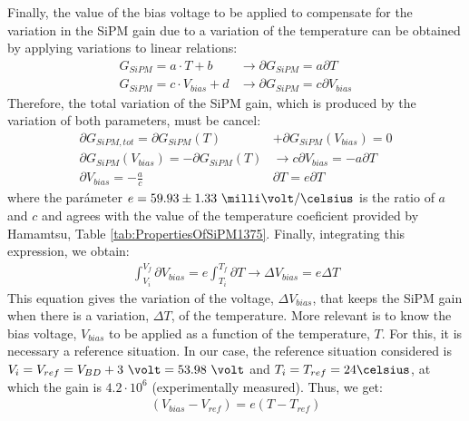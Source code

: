 Finally, the value of the bias voltage to be applied to compensate for the variation in the SiPM gain due to a variation of the temperature can be obtained by applying variations to linear relations:
\begin{equation*}
\begin{split}
G_{SiPM}=a \cdot{} T + b  &\longrightarrow \partial G_{SiPM}= a \partial T\\
G_{SiPM}=c \cdot{} V_{bias} + d &\longrightarrow \partial G_{SiPM}= c \partial V_{bias}
\label{Gain_compensationVariations}
\end{split}
\end{equation*} 
Therefore, the total variation of the SiPM gain, which is produced by the variation of both parameters, must be cancel:
\begin{equation*}
\begin{split}
\partial G_{SiPM, tot}= \partial G_{SiPM}(T) &+ \partial G_{SiPM}(V_{bias}) = 0\\ 
\partial G_{SiPM}(V_{bias}) = -\partial G_{SiPM}(T) &\longrightarrow c \partial V_{bias} = - a \partial T\\ 
\partial V_{bias}  = - \frac{a}{c}&\partial T = e \partial T
\label{Gain_compensation0}
\end{split}
\end{equation*} 
where the parámeter $e= 59.93 \pm 1.33~\milli\volt/\celsius $ is the ratio of $a$ and $c$ and agrees with the value of the temperature coeficient provided by Hamamtsu, Table \ref{tab:PropertiesOfSiPM1375}. Finally, integrating this expression, we obtain:
\begin{equation}
\begin{split}
\int_{V_i}^{V_f}\partial V_{bias}  = e\int_{T_i}^{T_f}\partial T \longrightarrow \Delta V_{bias} = e \Delta T
\label{Gain_compensationIntegring}
\end{split}
\end{equation} 
This equation gives the variation of the voltage, $\Delta V_{bias}$, that keeps the SiPM gain when there is a variation, $\Delta T$, of the temperature. More relevant is to know the bias voltage, $V_{bias}$ to be applied as a function of the temperature, $T$. For this, it is necessary a reference situation. In our case, the reference situation considered is $V_i=V_{ref}= V_{BD}+3~\volt = 53.98~\volt$ and $T_i=T_{ref}=24\celsius$, at which the gain is $4.2 \cdot{} 10^{6}$ (experimentally measured). Thus, we get:
\begin{equation*}
\begin{split}
(V_{bias}-V_{ref} )= e \left( T -T_{ref} \right) 
\label{Gain_compensationEquation}
\end{split}
\end{equation*}
